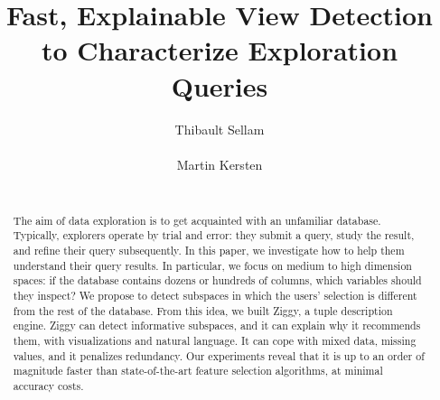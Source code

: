 \documentclass{sig-alternate-05-2015}
\begin{document}
\doi{ }

\title{Fast, Explainable View Detection\\ to Characterize Exploration Queries}

\author{
\alignauthor
Thibault Sellam\\
       \\
\alignauthor
Martin Kersten\\
       \\
}

\maketitle

\begin{abstract} 
The aim of data exploration is to get acquainted with an unfamiliar
database.  Typically, explorers operate by trial and error: they submit a
query, study the result, and refine their query subsequently. In this
paper, we investigate how to help them understand their query results.  In
particular, we focus on medium to high dimension spaces: if the database
contains dozens or hundreds of columns, which variables should they
inspect? We propose to detect subspaces in which the users' selection is
different  from the rest of the database. From this idea, we built Ziggy, a
tuple description engine.  Ziggy can detect informative subspaces, and it
can explain why it recommends them, with visualizations and natural
language.  It can cope with mixed data, missing values, and it penalizes
redundancy. Our experiments reveal that it is up to
an order of magnitude faster than state-of-the-art feature selection
algorithms, at minimal accuracy costs.
\end{abstract}
\end{document}
